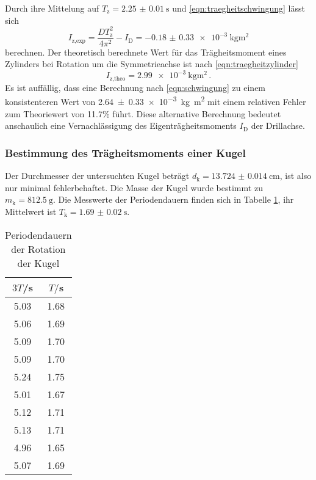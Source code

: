 Durch ihre Mittelung auf $T_{\text{z}}=\SI{2.25(001)}{\second}$ und
\eqref{eqn:traegheitschwingung} lässt sich
\begin{equation}
  I_{\text{z,exp}} = \frac{DT_{\text{z}}^2}{4\pi^2}-I_{\text{D}} = \SI{-0.18(033)e-3}{\kilogram\meter\squared}
\end{equation}
berechnen. Der theoretisch berechnete Wert für das Trägheitsmoment eines Zylinders
bei Rotation um die Symmetrieachse ist nach \eqref{eqn:traegheitzylinder}
\begin{equation}
  I_{\text{z,theo}} = \SI{2.99e-3}{\kilogram\meter\squared}\,.
\end{equation}
Es ist auffällig, dass eine Berechnung nach \eqref{eqn:schwingung} zu einem
konsistenteren Wert von \SI{2.64(033)e-3}{\kilogram\meter\squared} mit einem
relativen Fehler zum Theoriewert von 11.7\% führt. Diese alternative Berechnung
bedeutet anschaulich eine Vernachlässigung des Eigenträgheitsmoments $I_{\text{D}}$
der Drillachse.

\subsubsection{Bestimmung des Trägheitsmoments einer Kugel}
Der Durchmesser der untersuchten Kugel beträgt $d_{\text{k}}=\SI{13.724(0014)}{\cm}$,
ist also nur minimal fehlerbehaftet. Die Masse der Kugel wurde bestimmt zu
$m_{\text{k}}=\SI{812.5}{\gram}$. Die Messwerte der Periodendauern finden sich
in Tabelle \ref{tab:kugel}, ihr Mittelwert ist $T_{\text{k}}=\SI{1.69(002)}{\second}$.

\begin{table}
\centering
\caption{Periodendauern der Rotation der Kugel}
\label{tab:kugel}
\begin{tabular}{c c}
\toprule
$3T$/s & $T/$s \\
\midrule
5.03 & 1.68 \\
5.06 & 1.69 \\
5.09 & 1.70 \\
5.09 & 1.70 \\
5.24 & 1.75 \\
5.01 & 1.67 \\
5.12 & 1.71 \\
5.13 & 1.71 \\
4.96 & 1.65 \\
5.07 & 1.69 \\
\bottomrule
\end{tabular}
\end{table}

